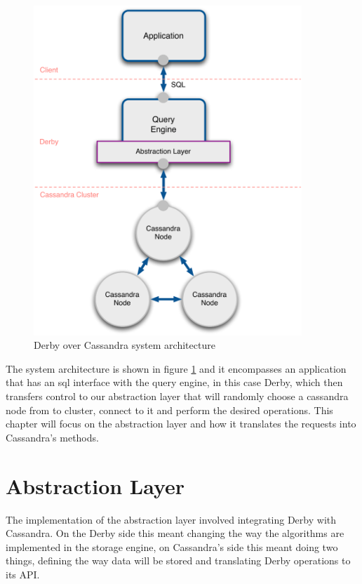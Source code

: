 \begin{figure}[!ht]
  \begin{center}
    \leavevmode
    \includegraphics[width=0.9\textwidth]{images/arch}
  \end{center}
  \caption{Derby over Cassandra system architecture}
  \label{fig:derbyCassandra}
\end{figure}

The system architecture is shown in figure \ref{fig:derbyCassandra} and it encompasses an application that has an \ac{sql} interface with the query engine, in this case Derby, which then transfers control to our abstraction layer that will randomly choose a cassandra node from to cluster, connect to it and perform the desired operations. This chapter will focus on the abstraction layer and how it translates the requests into Cassandra's methods.


\section{Abstraction Layer}

The implementation of the abstraction layer involved integrating Derby with Cassandra. On the Derby side this meant changing the way the algorithms are implemented in the storage engine, on Cassandra's side this meant doing two things, defining the way data will be stored and translating Derby operations to its API.  


